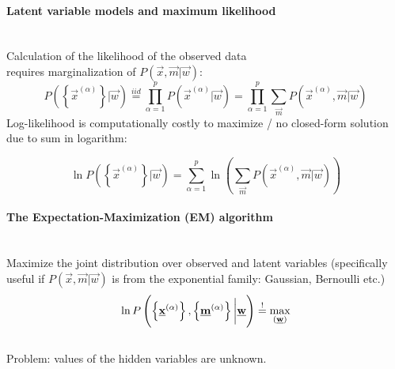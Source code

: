 \paragraph{Latent variable models and maximum likelihood}\mbox{}\\
Calculation of the likelihood of the observed data\\ requires marginalization of $P(\vec{x}, \vec{m} | \vec{w}):$
\begin{equation*}
P \left( \left\{ \vec{x}^{(\alpha)} \right\} | \vec{w} \right) \stackrel{iid}{=} \prod_{\alpha=1}^{p} P \left( \vec{x}^{(\alpha)} | \vec{w} \right) = \prod_{\alpha=1}^{p}  \sum_{\vec{m}} P \left( \vec{x}^{(\alpha)}, \vec{m} | \vec{w} \right)
\end{equation*}
Log-likelihood is computationally costly to maximize / no closed-form solution due to sum in logarithm:

\begin{equation*}
\ln P \left( \left\{ \vec{x}^{(\alpha)} \right\} | \vec{w} \right) = \sum_{\alpha=1}^{p}  \ln \left( \sum_{\vec{m}} P \left( \vec{x}^{(\alpha)}, \vec{m} | \vec{w} \right) \right)
\end{equation*}

\paragraph{The Expectation-Maximization (EM) algorithm}\mbox{}\\
\small
Maximize the joint distribution over observed and latent variables (specifically useful if $P(\vec{x}, \vec{m} | \vec{w})$ is from the exponential family: Gaussian, Bernoulli etc.) \\
\begin{equation*}
\ln P \left( \left\{ \underline{\mathbf{x}}^{(\alpha)} \right\}, \left\{ \underline{\mathbf{m}}^{(\alpha)} \right\} \bigg| \underline{\mathbf{w}} \right) \stackrel{\mathrm{!}}{=} \max_{(\underline{\mathbf{w}})} 
\end{equation*}\\
\vspace{3mm}
Problem: values of the hidden variables are unknown.


